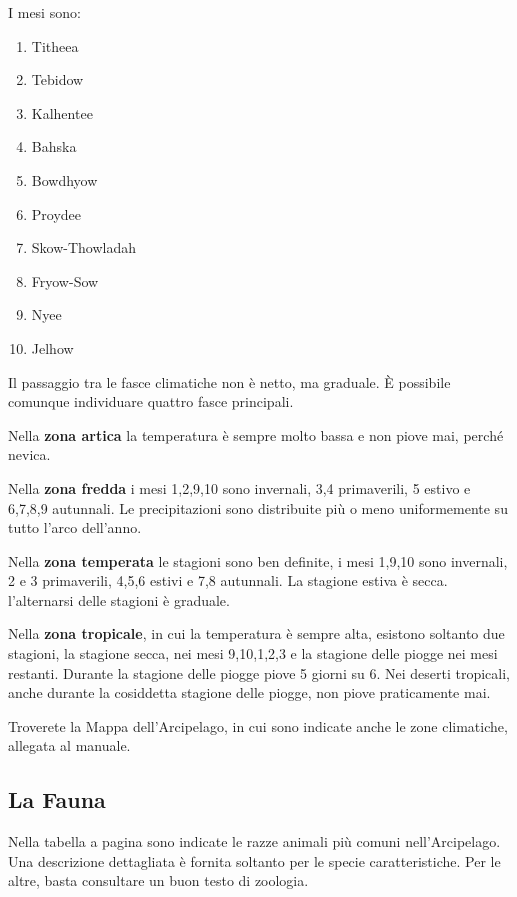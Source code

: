\iffullversion
I mesi sono: 

\begin{enumerate}\itemsep -6pt
\item Titheea
\item Tebidow
\item Kalhentee
\item Bahska
\item Bowdhyow
\item Proydee
\item Skow-Thowladah
\item Fryow-Sow
\item Nyee
\item Jelhow 
\end{enumerate}

Il passaggio tra le fasce climatiche non \`e netto, ma graduale. \`E
possibile comunque individuare quattro fasce principali.

Nella \textbf{zona artica} la temperatura \`e sempre molto bassa e
non piove mai, perch\'e nevica.

Nella \textbf{zona fredda} i mesi 1,2,9,10 sono invernali, 3,4
primaverili, 5 estivo e 6,7,8,9 autunnali. Le precipitazioni sono
distribuite pi\`u o meno uniformemente su tutto l'arco dell'anno.

Nella \textbf{zona temperata} le stagioni sono ben definite, i mesi
1,9,10 sono invernali, 2 e 3 primaverili, 4,5,6 estivi e 7,8
autunnali. La stagione estiva \`e secca.  l'alternarsi delle
stagioni \`e graduale.

Nella \textbf{zona tropicale}, in cui la temperatura \`e sempre
alta, esistono soltanto due stagioni, la stagione secca, nei mesi
9,10,1,2,3 e la stagione delle piogge nei mesi restanti. Durante la
stagione delle piogge piove 5 giorni su 6. Nei deserti tropicali,
anche durante la cosiddetta stagione delle piogge, non piove
praticamente mai.

Troverete la Mappa dell'Arcipelago, in cui sono indicate anche le zone
climatiche, allegata al manuale.

\subsection{La Fauna}
Nella tabella a pagina \pageref{tabanimali} sono indicate le razze
animali pi\`u comuni nell'Arcipelago. Una descrizione dettagliata
\`e fornita soltanto per le specie caratteristiche. Per le altre,
basta consultare un buon testo di zoologia.

